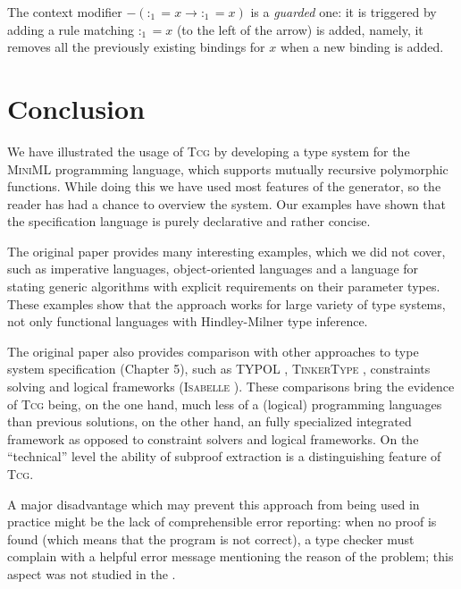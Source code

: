 \documentclass[screen]{beamer}
\newcommand{\Tcg}{\textsc{Tcg}}
\begin{document}
The context modifier $-(:_1 = x \rightarrow :_1 = x)$ is a \emph{guarded} one: it is triggered by adding a rule matching $:_1 = x$ (to the left of the arrow) is added, namely, it removes all the previously existing bindings for $x$ when a new binding is added.

\section{Conclusion}

We have illustrated the usage of \Tcg{} by developing a type system for the \textsc{MiniML} programming language, which supports mutually recursive polymorphic functions. While doing this we have used most features of the generator, so the reader has had a chance to overview the system. Our examples have shown that the specification language is purely declarative and rather concise.

The original paper \cite{Tcg} provides many interesting examples, which we did not cover, such as imperative languages, object-oriented languages and a language for stating generic algorithms with explicit requirements on their parameter types. These examples show that the approach works for large variety of type systems, not only functional languages with Hindley-Milner type inference. 

The original paper also provides comparison with other approaches to type system specification (Chapter 5), such as TYPOL \cite{Typol}, \textsc{TinkerType} \cite{Tinker}, constraints solving and logical frameworks (\textsc{Isabelle} \cite{Isabelle}). These comparisons bring the evidence of \Tcg{} being, on the one hand, much less of a (logical) programming languages than previous solutions, on the other hand,  an fully specialized integrated framework as opposed to constraint solvers and logical frameworks. On the ``technical'' level the ability of subproof extraction is a distinguishing feature of \Tcg{}.

A major disadvantage which may prevent this approach from being used in practice might be the lack of comprehensible error reporting: when no proof is found (which means that the program is not correct), a type checker must complain with a helpful error message mentioning the reason of the problem; this aspect was not studied in the \cite{Tcg}.
\end{document}
